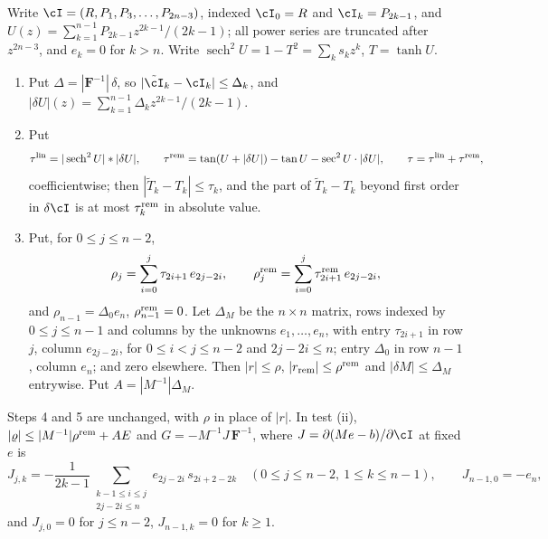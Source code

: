 %


Write $\cI=(R,P_1,P_3,\dots,P_{2n-3})$, indexed $\cI_0=R$ and $\cI_k=P_{2k-1}$, and
$U(z)=\sum_{k=1}^{n-1}P_{2k-1}z^{2k-1}/(2k-1)$; all power series are truncated after $z^{2n-3}$, and
$e_k=0$ for $k>n$. Write $\operatorname{sech}^2U=1-T^2=\sum_ks_kz^k$, $T=\tanh U$.


\begin{enumerate}[label=\arabic*.]
\item Put $\Delta=|\mathbf F^{-1}|\,\delta$, so $|\tilde\cI_k-\cI_k|\le\Delta_k$, and
  $|\delta U|(z)=\sum_{k=1}^{n-1}\Delta_kz^{2k-1}/(2k-1)$.
\item Put
  \[
    \tau^{\rm lin}=|\operatorname{sech}^2U|*|\delta U|,\qquad
    \tau^{\rm rem}=\tan(U+|\delta U|)-\tan U-\sec^2U\cdot|\delta U|,\qquad
    \tau=\tau^{\rm lin}+\tau^{\rm rem},
  \]
  coefficientwise; then $|\tilde T_k-T_k|\le\tau_k$, and the part of $\tilde T_k-T_k$ beyond first order
  in $\delta\cI$ is at most $\tau^{\rm rem}_k$ in absolute value.
\item Put, for $0\le j\le n-2$,
  \[
    \rho_j=\sum_{i=0}^{j}\tau_{2i+1}\,e_{2j-2i},\qquad
    \rho^{\rm rem}_j=\sum_{i=0}^{j}\tau^{\rm rem}_{2i+1}\,e_{2j-2i},
  \]
  and $\rho_{n-1}=\Delta_0e_n$, $\rho^{\rm rem}_{n-1}=0$. Let $\Delta_M$ be the $n\times n$ matrix, rows
  indexed by $0\le j\le n-1$ and columns by the unknowns $e_1,\dots,e_n$, with entry $\tau_{2i+1}$ in
  row $j$, column $e_{2j-2i}$, for $0\le i<j\le n-2$ and $2j-2i\le n$; entry $\Delta_0$ in row $n-1$,
  column $e_n$; and zero elsewhere. Then $|r|\le\rho$, $|r_{\rm rem}|\le\rho^{\rm rem}$ and
  $|\delta M|\le\Delta_M$ entrywise. Put $A=|M^{-1}|\Delta_M$.
\end{enumerate}
Steps 4 and 5 are unchanged, with $\rho$ in place of $|r|$. In test (ii), $|\varrho|\le|M^{-1}|\rho^{\rm rem}+AE$
and $G=-M^{-1}J\,\mathbf F^{-1}$, where $J=\partial(Me-b)/\partial\cI$ at fixed $e$ is
\[
  J_{j,k}=-\frac1{2k-1}\sum_{\substack{k-1\le i\le j\\2j-2i\le n}}e_{2j-2i}\,s_{2i+2-2k}\quad(0\le j\le n-2,\ 1\le k\le n-1),
  \qquad J_{n-1,0}=-e_n,
\]
and $J_{j,0}=0$ for $j\le n-2$, $J_{n-1,k}=0$ for $k\ge1$.

